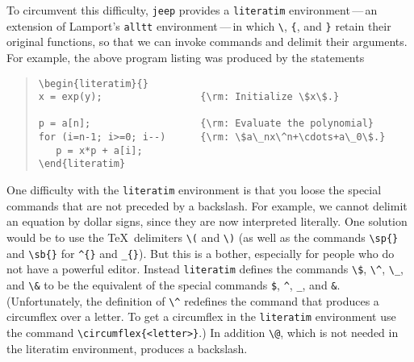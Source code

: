 To circumvent this difficulty, \verb|jeep| provides a
\verb|literatim| environment\,---\,an extension of Lamport's
\verb|alltt| environment\,---\,in which \verb|\|, \verb|{|, and
\verb|}| retain their original functions,  so that we can
invoke commands and delimit their arguments.  For example,
the above program listing was produced by the statements
\begin{quote}
\small
\begin{verbatim}
\begin{literatim}{}
x = exp(y);                 {\rm: Initialize \$x\$.}

p = a[n];                   {\rm: Evaluate the polynomial}
for (i=n-1; i>=0; i--)      {\rm: \$a\_nx\^n+\cdots+a\_0\$.} 
   p = x*p + a[i];
\end{literatim}
\end{verbatim}
\end{quote}


One difficulty with the \verb|literatim| environment is that you loose
the special commands that are not preceded by a backslash.  For
example, we cannot delimit an equation by dollar signs, since they
are now interpreted literally.  One solution would be to use the
\TeX\ delimiters \verb|\(| and \verb|\)|  
(as well as the commands \verb|\sp{}|
and \verb|\sb{}| for \verb|^{}| and \verb|_{}|).  But this is a
bother, especially for people who do not have a powerful editor.
Instead \verb|literatim| defines the commands \verb|\$|, \verb|\^|,
\verb|\_|, and \verb|\&| to be the equivalent of the special
commands \verb|$|, \verb|^|, \verb|_|, and \verb|&|.  (Unfortunately, the
definition of \verb|\^| redefines the command that produces a
circumflex over a letter.  To get a circumflex in the
\verb|literatim| environment use the command \verb|\circumflex{<letter>}|.)
In addition \verb|\@|, which is not needed in the literatim environment,
produces a backslash.

